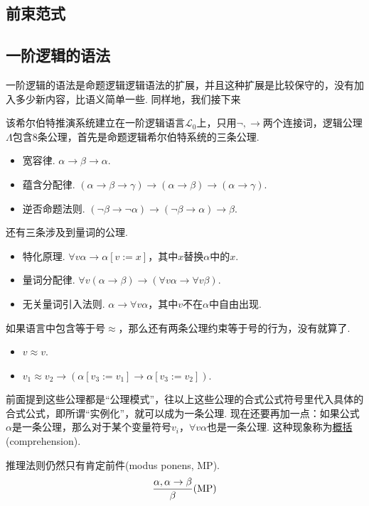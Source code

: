 \documentclass[main.tex]{subfiles}
\begin{document}
\subsection{前束范式}

\subsection{一阶逻辑的语法}

一阶逻辑的语法是命题逻辑逻辑语法的扩展，并且这种扩展是比较保守的，没有加入多少新内容，比语义简单一些. 同样地，我们接下来

该希尔伯特推演系统建立在一阶逻辑语言\(\mathcal{L}_0\)上，只用\(\neg, \to\)两个连接词，逻辑公理\(\Lambda\)包含8条公理，首先是命题逻辑希尔伯特系统的三条公理.
\begin{itemize}
    \item [(A1)] 宽容律. \(\alpha \to \beta \to \alpha\).
    \item [(A2)] 蕴含分配律. \((\alpha \to \beta \to \gamma) \to (\alpha \to \beta) \to (\alpha \to \gamma)\).
    \item [(A3)] 逆否命题法则. \((\neg \beta \to \neg \alpha) \to (\neg \beta \to \alpha) \to \beta\).
\end{itemize}
还有三条涉及到量词的公理.
\begin{itemize}
    \item [(Q1)] 特化原理. \(\forall v \alpha \to \alpha[v:=x]\)，其中\(x\)替换\(\alpha\)中的\(x\).
    \item [(Q2)] 量词分配律. \(\forall v(\alpha \to \beta) \to (\forall v \alpha \to \forall v \beta)\).
    \item [(Q3)] 无关量词引入法则. \(\alpha \to \forall v \alpha\)，其中\(v\)不在\(\alpha\)中自由出现.
\end{itemize}
如果语言中包含等于号\(\approx\)，那么还有两条公理约束等于号的行为，没有就算了.
\begin{itemize}
    \item [(E1)] \(v \approx v\).
    \item [(E2)] \(v_1 \approx v_2 \to (\alpha[v_3:=v_1] \to \alpha[v_3:=v_2])\).
\end{itemize}

前面提到这些公理都是“公理模式”，往以上这些公理的合式公式符号里代入具体的合式公式，即所谓“实例化”，就可以成为一条公理. 现在还要再加一点：如果公式\(\alpha\)是一条公理，那么对于某个变量符号\(v_i\)，\(\forall v\alpha\)也是一条公理. 这种现象称为\uline{概括}(comprehension).

推理法则仍然只有肯定前件(modus ponens, MP).
\[{{\alpha, \alpha \to \beta} \over {\beta}} ({\rm MP})\]
\end{document}
